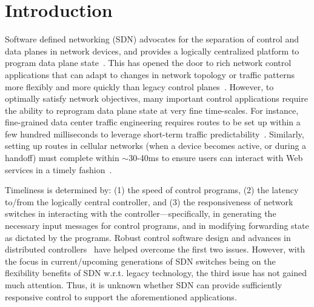 \section{Introduction}\label{sec-intro}

Software defined networking (SDN) 
advocates for the separation of control and
data planes in network devices, and provides a logically centralized platform
to program data plane state~\cite{openflow,rethinking}.  This 
has opened the
door to rich network control applications that can adapt to changes in
network topology or traffic patterns more flexibly and more quickly than 
legacy control
planes~\cite{swan,b4,ananta,elastictree,softcell,zupdate,microte}.
However, to optimally satisfy network objectives, many important control 
applications require the ability to reprogram data plane state at very fine 
time-scales. For instance, fine-grained data center
traffic engineering requires routes to be set up within a few hundred
milliseconds to leverage short-term traffic
predictability~\cite{microte}. Similarly, setting up routes in
cellular networks (when a device becomes active, or during a handoff)
must complete within $\sim$30-40ms to ensure users can interact with
Web services in a timely fashion~\cite{softcell}.

Timeliness
is determined by: (1) the speed of control programs, (2) the latency
to/from the logically central controller, and (3) the responsiveness
of network switches in interacting with the controller---specifically,
in generating the necessary input messages for control programs, and
in modifying forwarding state as dictated by the programs. Robust control
software design and advances in distributed controllers~\cite{onix}
have helped overcome the first two issues. However, with the focus in
current/upcoming generations of SDN switches being on the flexibility
benefits of SDN w.r.t. legacy technology, the third issue has
not gained much attention. Thus, it is unknown whether SDN can
provide sufficiently responsive control to support the aforementioned
applications.


